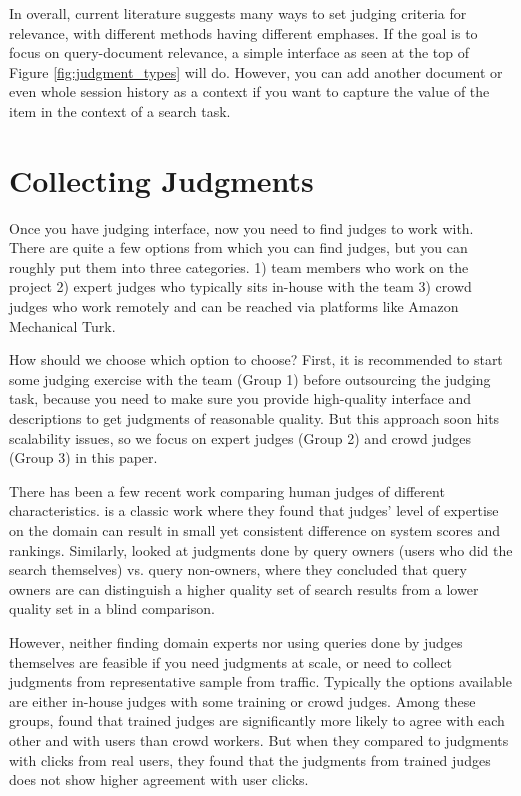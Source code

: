\documentclass[openany]{now} %
\begin{document}
In overall, current literature suggests many ways to set judging criteria for relevance, with different methods having different emphases. If the goal is to focus on query-document relevance, a simple interface as seen at the top of Figure \ref{fig:judgment_types} will do. However, you can add another document or even whole session history as a context if you want to capture the value of the item in the context of a search task. 

\section{Collecting Judgments}

Once you have judging interface, now you need to find judges to work with. There are quite a few options from which you can find judges, but you can roughly put them into three categories. 1) team members who work on the project 2) expert judges who typically sits in-house with the team 3) crowd judges who work remotely and can be reached via platforms like Amazon Mechanical Turk. 

How should we choose which option to choose? First, it is recommended to start some judging exercise with the team (Group 1) before outsourcing the judging task, because you need to make sure you provide high-quality interface and descriptions to get judgments of reasonable quality. But this approach soon hits scalability issues, so we focus on expert judges (Group 2) and crowd judges (Group 3) in this paper.

There has been a few recent work comparing human judges of different characteristics. \cite{Bailey:2008} is a classic work where they found that judges' level of expertise on the domain can result in small yet consistent difference on system scores and rankings. Similarly, \cite{Chouldechova:2013} looked at judgments done by query owners (users who did the search themselves) vs. query non-owners, where they concluded that query owners are can distinguish a higher quality set of search results from a lower quality set in a blind comparison.

However, neither finding domain experts nor using queries done by judges themselves are feasible if you need judgments at scale, or need to collect judgments from representative sample from traffic. Typically the options available are either in-house judges with some training or crowd judges. Among these groups,  \cite{Kazai:2013} found that trained judges are significantly more likely to agree with each other and with users than crowd workers. But when they compared to judgments with clicks from real users, they found that the judgments from trained judges does not show higher agreement with user clicks.
\end{document}
